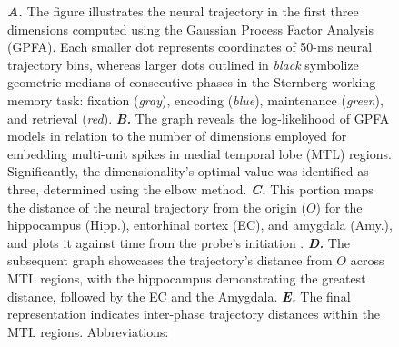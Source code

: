 \documentclass[final,3p,times,twocolumn]{elsarticle}
\begin{document}
\begin{figure}[ht]
{\textbf{\textit{A.}} The figure illustrates the neural trajectory in the first three dimensions computed using the Gaussian Process Factor Analysis (GPFA). Each smaller dot represents coordinates of 50-ms neural trajectory bins, whereas larger dots outlined in \textit{black} symbolize geometric medians of consecutive phases in the Sternberg working memory task: fixation (\textit{gray}), encoding (\textit{blue}), maintenance (\textit{green}), and retrieval (\textit{red})\cite{yu_gaussian-process_2009}. \textbf{\textit{B.}} The graph reveals the log-likelihood of GPFA models in relation to the number of dimensions employed for embedding multi-unit spikes in medial temporal lobe (MTL) regions. Significantly, the dimensionality's optimal value was identified as three, determined using the elbow method\cite{virtanen_scipy_2020}. \textbf{\textit{C.}} This portion maps the distance of the neural trajectory from the origin ($O$) for the hippocampus (Hipp.), entorhinal cortex (EC), and amygdala (Amy.), and plots it against time from the probe's initiation \cite{boran_dataset_2020}. \textbf{\textit{D.}} The subsequent graph showcases the trajectory's distance from $O$ across MTL regions, with the hippocampus demonstrating the greatest distance, followed by the EC and the Amygdala\cite{fernandez-ruiz_long-duration_2019}. \textbf{\textit{E.}} The final representation indicates inter-phase trajectory distances within the MTL regions\cite{liu_consensus_2022}.
Abbreviations:
}
        	\label{fig:02}
        \end{figure}
        \clearpage
\end{document}
